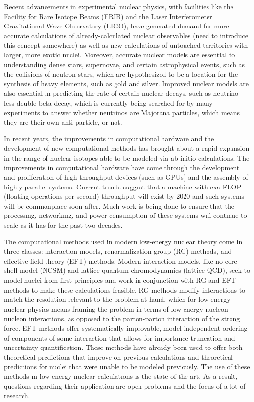 Recent advancements in experimental nuclear physics, with facilities like the Facility for Rare Isotope Beams (FRIB) and the Laser Interferometer Gravitational-Wave Observatory (LIGO), have generated demand for more accurate calculations of already-calculated nuclear observables (need to introduce this concept somewhere) as well as new calculations of untouched territories with larger, more exotic nuclei. Moreover, accurate nuclear models are essential to understanding dense stars, supernovae, and certain astrophysical events, such as the collisions of neutron stars, which are hypothesized to be a location for the synthesis of heavy elements, such as gold and silver. Improved nuclear models are also essential in predicting the rate of certain nuclear decays, such as neutrino-less double-beta decay, which is currently being searched for by many experiments to answer whether neutrinos are Majorana particles, which means they are their own anti-particle, or not.

In recent years, the improvements in computational hardware and the development of new computational methods has brought about a rapid expansion in the range of nuclear isotopes able to be modeled via ab-initio calculations. The improvements in computational hardware have come through the development and proliferation of high-throughput devices (such as GPUs) and the assembly of highly parallel systems. Current trends suggest that a machine with exa-FLOP (floating-operations per second) throughput will exist by 2020 and such systems will be commonplace soon after. Much work is being done to ensure that the processing, networking, and power-consumption of these systems will continue to scale as it has for the past two decades. 

The computational methods used in modern low-energy nuclear theory come in three classes: interaction models, renormalization group (RG) methods, and effective field theory (EFT) methods. Modern interaction models, like no-core shell model (NCSM) and lattice quantum chromodynamics (lattice QCD), seek to model nuclei from first principles and work in conjunction with RG and EFT methods to make these calculations feasible. RG methods modify interactions to match the resolution relevant to the problem at hand, which for low-energy nuclear physics means framing the problem in terms of low-energy nucleon-nucleon interactions, as opposed to the parton-parton interaction of the strong force. EFT methods offer systematically improvable, model-independent ordering of components of some interaction that allows for importance truncation and uncertainty quantification. These methods have already been used to offer both theoretical predictions that improve on previous calculations and theoretical predictions for nuclei that were unable to be modeled previously. The use of these methods in low-energy nuclear calculations is the state of the art. As a result, questions regarding their application are open problems and the focus of a lot of research.

